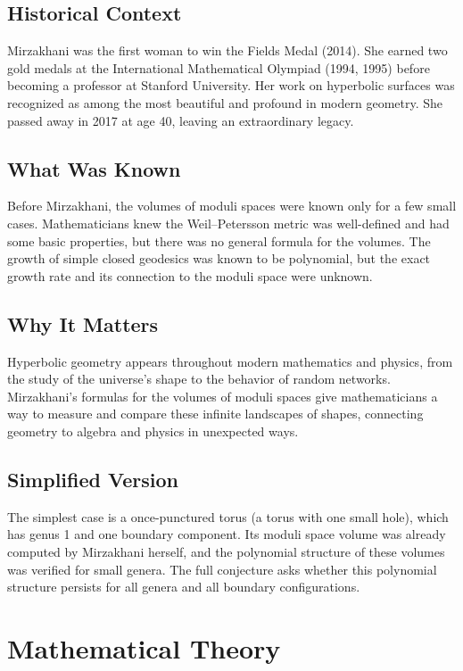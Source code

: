 \subsection{Historical Context}
Mirzakhani was the first woman to win the Fields Medal (2014). She earned two gold medals at the International Mathematical Olympiad (1994, 1995) before becoming a professor at Stanford University. Her work on hyperbolic surfaces was recognized as among the most beautiful and profound in modern geometry. She passed away in 2017 at age 40, leaving an extraordinary legacy.

\subsection{What Was Known}
Before Mirzakhani, the volumes of moduli spaces were known only for a few small cases. Mathematicians knew the Weil--Petersson metric was well-defined and had some basic properties, but there was no general formula for the volumes. The growth of simple closed geodesics was known to be polynomial, but the exact growth rate and its connection to the moduli space were unknown.

\subsection{Why It Matters}
Hyperbolic geometry appears throughout modern mathematics and physics, from the study of the universe's shape to the behavior of random networks. Mirzakhani's formulas for the volumes of moduli spaces give mathematicians a way to measure and compare these infinite landscapes of shapes, connecting geometry to algebra and physics in unexpected ways.

\subsection{Simplified Version}
The simplest case is a once-punctured torus (a torus with one small hole), which has genus 1 and one boundary component. Its moduli space volume was already computed by Mirzakhani herself, and the polynomial structure of these volumes was verified for small genera. The full conjecture asks whether this polynomial structure persists for all genera and all boundary configurations.

\section{Mathematical Theory}


